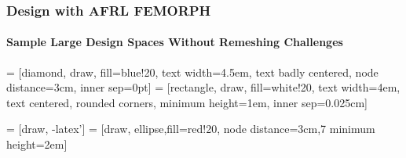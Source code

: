 \documentclass[t]{beamer}
\begin{document}
\begin{frame}
  \frametitle{Design with AFRL FEMORPH}
  \framesubtitle{Sample Large Design Spaces Without Remeshing Challenges}

   = [diamond, draw, fill=blue!20, 
    text width=4.5em, text badly centered, node distance=3cm, inner sep=0pt]
   = [rectangle, draw, fill=white!20, 
    text width=4em, text centered, rounded corners, minimum height=1em, inner sep=0.025cm]

   = [draw, -latex']
   = [draw, ellipse,fill=red!20, node distance=3cm,7
    minimum height=2em]
  
\end{frame}
\end{document}
